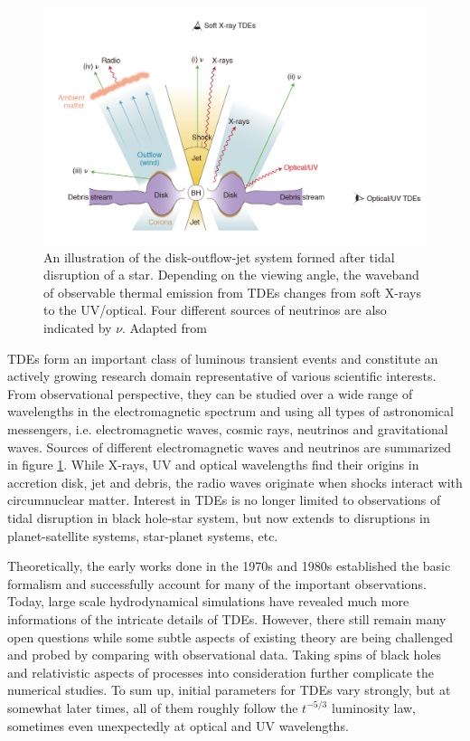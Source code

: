 \documentclass{tda}
\begin{document}
\begin{figure} [h]
	\centering
	\captionsetup{width=.85\linewidth}
	\includegraphics[width=.6\linewidth]{./images/hayasaki2021.png}
	\caption{An illustration of the disk-outflow-jet system formed after tidal disruption of a star. Depending on the viewing angle, the
waveband of observable thermal emission from TDEs changes from soft X-rays to the UV/optical. Four different sources of neutrinos are also indicated by \(\nu\). Adapted from \cite{hayasaki_neutrinos_2021}}
	\label{fig:em_neutrino_sources}
\end{figure}

TDEs form an important class of luminous transient events and constitute an actively growing research domain representative of various scientific interests. From observational perspective, they can be studied over a wide range of wavelengths in the electromagnetic spectrum and using all types of astronomical messengers, i.e. electromagnetic waves, cosmic rays, neutrinos and gravitational waves. Sources of different electromagnetic waves and neutrinos are summarized in figure \ref{fig:em_neutrino_sources}. While X-rays, UV and optical wavelengths find their origins in accretion disk, jet and debris, the radio waves originate when shocks interact with circumnuclear matter. Interest in TDEs is no longer limited to observations of tidal disruption in black hole-star system, but now extends to disruptions in planet-satellite systems, star-planet systems, etc.

Theoretically, the early works done in the 1970s and 1980s established the basic formalism and successfully account for many of the important observations. Today, large scale hydrodynamical simulations have revealed much more informations of the intricate details of TDEs. However, there still remain many open questions while some subtle aspects of existing theory are being challenged and probed by comparing with observational data. Taking spins of black holes and relativistic aspects of processes into consideration further complicate the numerical studies. To sum up, initial parameters for TDEs vary strongly, but at somewhat later times, all of them roughly follow the \(t^{-5/3}\) luminosity law, sometimes even unexpectedly at optical and UV wavelengths.
\end{document}
